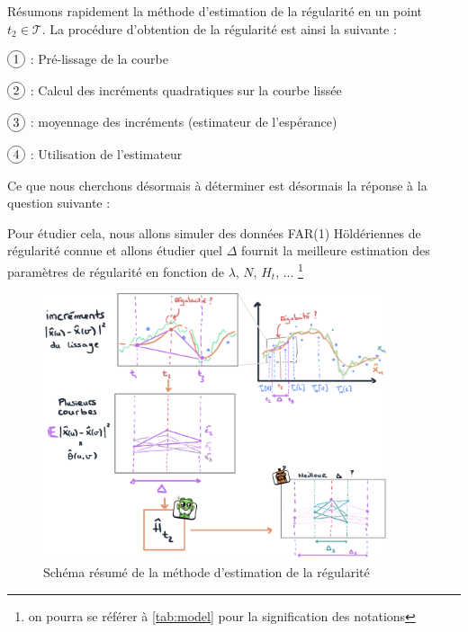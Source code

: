 Résumons rapidement la méthode d'estimation de la régularité en un point $t_2 \in \mathcal T$.
\noindent La procédure d'obtention de la régularité est ainsi la suivante :

$\circled 1$ : Pré-lissage de la courbe

$\circled 2$ : Calcul des incréments quadratiques sur la courbe lissée

$\circled 3$ : moyennage des incréments (estimateur de l'espérance)

$\circled 4$ : Utilisation de l'estimateur

Ce que nous cherchons désormais à déterminer est désormais la réponse à la question suivante :


Pour étudier cela, nous allons simuler des données FAR(1) Höldériennes de régularité connue et allons étudier quel $\Delta$ fournit la meilleure estimation des paramètres de régularité en fonction de $\lambda$, $N$, $H_t$, ... \footnote{on pourra se référer à \ref{tab:model} pour la signification des notations}

\begin{figure}[H]
	\begin{center}
		\includegraphics[width=0.9\textwidth]{Images/sketches/estim_reg.jpg}
	\end{center}

	\caption{Schéma résumé de la méthode d'estimation de la régularité}
	\label{fig:sketch_estim_reg_methodo}
\end{figure}

